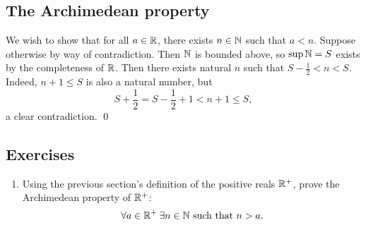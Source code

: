 \documentclass[master.tex]{subfiles}
\begin{document}
    \subsection{The Archimedean property}
    We wish to show that for all $a \in \mathbb{R}$, there exists $n \in \mathbb{N}$ such that $a < n$.
    Suppose otherwise by way of contradiction.
    Then $\mathbb{N}$ is bounded above, so $\sup{\mathbb{N}} = S$ exists by the completeness of $\mathbb{R}$.
    Then there exists natural $n$ such that $S - \frac{1}{2} < n < S$.
    Indeed, $n + 1 \leq S$ is also a natural number, but
    \[
        S + \frac{1}{2} = S - \frac{1}{2} + 1 < n + 1 \leq S
    ,\]
    a clear contradiction. \qed


    \subsection*{Exercises}
    \begin{enumerate}[font=\bfseries]
        \item Using the previous section's definition of the positive reals $\mathbb{R}^{+}$, prove the Archimedean property of $\mathbb{R}^{+}$:
        \[
            \forall a \in \mathbb{R}^{+} \: \exists n \in \mathbb{N} \text{ such that } n > a
        .\]
    \end{enumerate}
\end{document}
